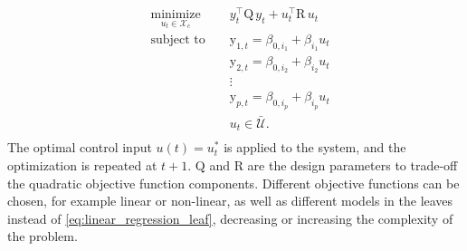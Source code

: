 \begin{equation}\label{eq:mbCRT}
\begin{aligned}
& \underset{u_t \in \mathcal{X}_c}{\text{minimize}} & &  y^\top_t \mathrm{Q}\, y_t + u^\top_t \mathrm{R}\, u_t              \\
& \text{subject to }                                & &  \mathrm{y}_{1,t}    =   \beta_{0,i_1} + \beta_{i_1}u_t     \\
&                                                   & &  \mathrm{y}_{2,t}    =   \beta_{0,i_2} + \beta_{i_2}u_t     \\
&                                                   & &  \vdots                                                         \\
&                                                   & &  \mathrm{y}_{p,t}    =   \beta_{0,i_p} + \beta_{i_p}u_t     \\
&                                                   & &  u_t                \in  \mathcal{\bar U}.                       \\
\end{aligned}
\end{equation}
The optimal control input $u(t) = u^*_t$ is applied to the system, and the optimization is repeated at $t+1$. $\mathrm{Q}$ and $\mathrm{R}$ are the design parameters to trade-off the quadratic objective function components. Different objective functions can be chosen, for example linear or non-linear, as well as different models in the leaves instead of \eqref{eq:linear_regression_leaf}, decreasing or increasing the complexity of the problem.
